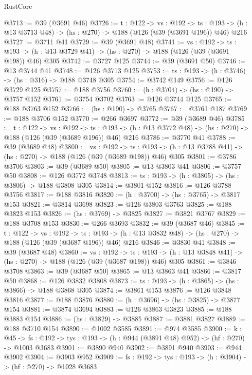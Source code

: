 \begin{lexlean}{RustCore}
\begin{coremodule}
@3713 := @39 (@3691 @46)
@3726 := {t : @122} ->
  {vs : @192} ->
  {ts : @193} -> (h : @13 @3713 @48) -> (hs : @270) -> @188 (@126 (@39 (@3691 @196)) @46) @216
@3727 := @3711 @41
@3729 := @39 (@3691 @48)
@3741 := {vs : @192} ->
  {ts : @193} -> (h : @13 @3729 @41) -> (hs : @270) -> @188 (@126 (@39 (@3691 @198)) @46) @305
@3742 := @3727 @125
@3744 := @39 (@3691 @50)
@3746 := @13 @3744 @41
@3748 := @126 @3713 @125
@3753 := {ts : @193} -> (h : @3746) -> (hs : @316) -> @188 @3748 @305
@3754 := @3742 @149
@3756 := @126 @3729 @125
@3757 := @188 @3756
@3760 := (h : @3704) -> (hs : @190) -> @3757 @152
@3761 := @3754 @3702
@3763 := @126 @3744 @125
@3765 := @188 @3763 @152
@3766 := (hs : @190) -> @3765
@3767 := @3761 @187
@3769 := @188 @3706 @152
@3770 := @266 @3697
@3772 := @39 (@3689 @46)
@3785 := {t : @122} ->
  {vs : @192} ->
  {ts : @193} -> (h : @13 @3772 @48) -> (hs : @270) -> @188 (@126 (@39 (@3689 @196)) @46) @216
@3786 := @3770 @41
@3788 := @39 (@3689 @48)
@3800 := {vs : @192} ->
  {ts : @193} -> (h : @13 @3788 @41) -> (hs : @270) -> @188 (@126 (@39 (@3689 @198)) @46) @305
@3801 := @3786 @3706
@3803 := @39 (@3689 @50)
@3805 := @13 @3803 @41
@3806 := @3757 @50
@3808 := @126 @3772 @3748
@3813 := {ts : @193} -> (h : @3805) -> (hs : @3806) -> @188 @3808 @305
@3814 := @3801 @152
@3816 := @126 @3788 @3756
@3817 := @188 @3816
@3820 := (h : @3700) -> (hs : @3765) -> @3817 @153
@3821 := @3814 @3698
@3823 := @126 @3803 @3763
@3825 := @188 @3823 @153
@3826 := (hs : @3769) -> @3825
@3827 := @3821 @3767
@3829 := @188 @3708 @153
@3830 := @266 @3693
@3832 := @39 (@3687 @46)
@3845 := {t : @122} ->
  {vs : @192} ->
  {ts : @193} -> (h : @13 @3832 @48) -> (hs : @270) -> @188 (@126 (@39 (@3687 @196)) @46) @216
@3846 := @3830 @41
@3848 := @39 (@3687 @48)
@3860 := {vs : @192} ->
  {ts : @193} -> (h : @13 @3848 @41) -> (hs : @270) -> @188 (@126 (@39 (@3687 @198)) @46) @305
@3861 := @3846 @3708
@3863 := @39 (@3687 @50)
@3865 := @13 @3863 @41
@3866 := @3817 @50
@3868 := @126 @3832 @3808
@3873 := {ts : @193} -> (h : @3865) -> (hs : @3866) -> @188 @3868 @305
@3874 := @3861 @153
@3876 := @126 @3848 @3816
@3877 := @188 @3876
@3880 := (h : @3696) -> (hs : @3825) -> @3877 @154
@3881 := @3874 @3694
@3883 := @126 @3863 @3823
@3885 := @188 @3883 @154
@3886 := (hs : @3829) -> @3885
@3887 := @3881 @3827
@3889 := @188 @3710 @154
@3890 := @1002 @3585
@3891 := @974 @3585
@3900 := {k : @45} ->
  {fs : @192} -> {tys : @193} -> (h : @944 (@3891 @48) @952) -> (hf : @270) -> @1003 @3683
@3901 := @3890 @940
@3902 := @3891 @940
@3903 := @944 @3902
@3904 := @3903 @952
@3909 := {fs : @192} -> {tys : @193} -> (h : @3904) -> (hf : @270) -> @1028 @3683

\end{coremodule}
\end{lexlean}
